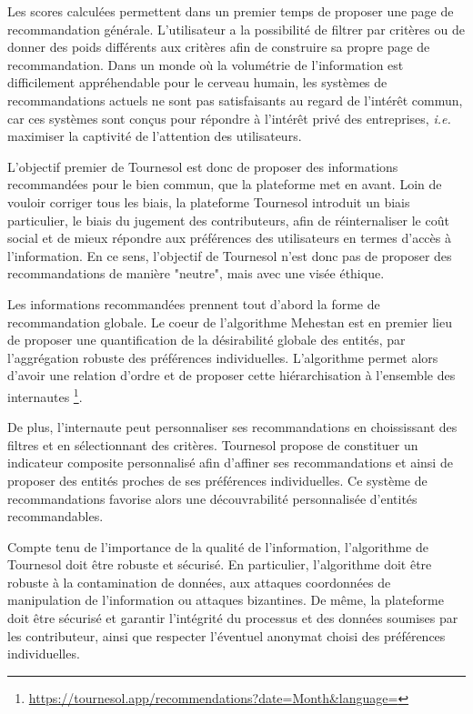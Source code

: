 Les scores calculées permettent dans un premier temps de proposer une page de recommandation générale. L'utilisateur a la possibilité de filtrer par critères ou de donner des poids différents aux critères afin de construire sa propre page de recommandation. Dans un monde où la volumétrie de l'information est difficilement appréhendable pour le cerveau humain, les systèmes de recommandations actuels ne sont pas satisfaisants au regard de l'intérêt commun, car ces systèmes sont conçus pour répondre à l'intérêt privé des entreprises, \textit{i.e.} maximiser la captivité de l'attention des utilisateurs. 

L'objectif premier de Tournesol est donc de proposer des informations recommandées pour le bien commun, que la plateforme met en avant. Loin de vouloir corriger tous les biais, la plateforme Tournesol introduit un biais particulier, le biais du jugement des contributeurs, afin de réinternaliser le coût social et de mieux répondre aux préférences des utilisateurs en termes d'accès à l'information. En ce sens, l'objectif de Tournesol n'est donc pas de proposer des recommandations de manière "neutre", mais avec une visée éthique.

Les informations recommandées prennent tout d'abord la forme de recommandation globale. Le coeur de l'algorithme Mehestan est en premier lieu de proposer une quantification de la désirabilité globale des entités, par l'aggrégation robuste des préférences individuelles. L'algorithme permet alors d'avoir une relation d'ordre et de proposer cette hiérarchisation à l'ensemble des internautes \footnote{\href{https://tournesol.app/recommendations?date=Month&language=}{https://tournesol.app/recommendations?date=Month&language=}}.

De plus, l'internaute peut personnaliser ses recommandations en choississant des filtres et en sélectionnant des critères. Tournesol propose de constituer un indicateur composite personnalisé afin d'affiner ses recommandations et ainsi de proposer des entités proches de ses préférences individuelles. Ce système de recommandations favorise alors une découvrabilité personnalisée d'entités recommandables.

Compte tenu de l'importance de la qualité de l'information, l'algorithme de Tournesol doit être robuste et sécurisé. En particulier, l'algorithme doit être robuste à la contamination de données, aux attaques coordonnées de manipulation de l'information ou attaques bizantines. De même, la plateforme doit être sécurisé et garantir l'intégrité du processus et des données soumises par les contributeur, ainsi que respecter l'éventuel anonymat choisi des préférences individuelles.


